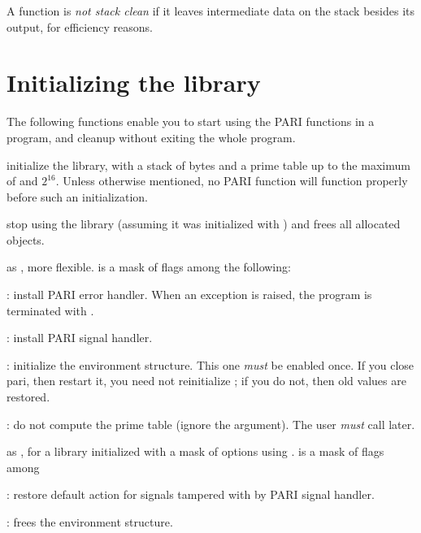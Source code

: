 A function is \emph{not stack clean} if it leaves intermediate data on the
stack besides its output, for efficiency reasons.

\section{Initializing the library}

The following functions enable you to start using the PARI functions
in a program, and cleanup without exiting the whole program.


 initialize the
library, with a stack of  bytes and a prime table
up to the maximum of  and $2^{16}$. Unless otherwise
mentioned, no PARI function will function properly before such an
initialization.

 stop using the library (assuming it was
initialized with ) and frees all allocated objects.

\label{se:pari_init_tech}

 as
, more flexible.  is a mask of flags
among the following:

  : install PARI error handler. When an exception is
raised, the program is terminated with .

  : install PARI signal handler.

  : initialize the  environment structure.
This one \emph{must} be enabled once. If you close pari, then restart it,
you need not reinitialize ; if you do not, then old values are
restored.

  : do not compute the prime table (ignore the
   argument). The user \emph{must} call
   later.

 as ,
for a library initialized with a mask of options using
.  is a mask of flags among

  : restore  default action for signals
tampered with by PARI signal handler.

  : frees the  environment structure.

